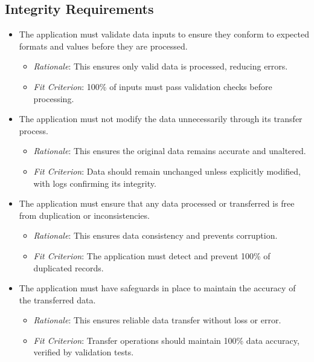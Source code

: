 \documentclass[12pt]{article}
\begin{document}
\subsection{Integrity Requirements}
\begin{itemize}
    \item The application must validate data inputs to ensure they conform to
    expected formats and values before they are processed.
    \begin{itemize}
        \item \textit{Rationale}: This ensures only valid data is processed,
        reducing errors.
        \item \textit{Fit Criterion}: 100\% of inputs must pass validation
        checks before processing.
    \end{itemize}
    
    \item The application must not modify the data unnecessarily through its
    transfer process.
    \begin{itemize}
        \item \textit{Rationale}: This ensures the original data remains
        accurate and unaltered.
        \item \textit{Fit Criterion}: Data should remain unchanged unless
        explicitly modified, with logs confirming its integrity.
    \end{itemize}
    
    \item The application must ensure that any data processed or transferred is
    free from duplication or inconsistencies.
    \begin{itemize}
        \item \textit{Rationale}: This ensures data consistency and prevents
        corruption.
        \item \textit{Fit Criterion}: The application must detect and prevent
        100\% of duplicated records.
    \end{itemize}
    
    \item The application must have safeguards in place to maintain the accuracy
    of the transferred data.
    \begin{itemize}
        \item \textit{Rationale}: This ensures reliable data transfer without
        loss or error.
        \item \textit{Fit Criterion}: Transfer operations should maintain 100\%
        data accuracy, verified by validation tests.
    \end{itemize}
\end{itemize}
\end{document}
